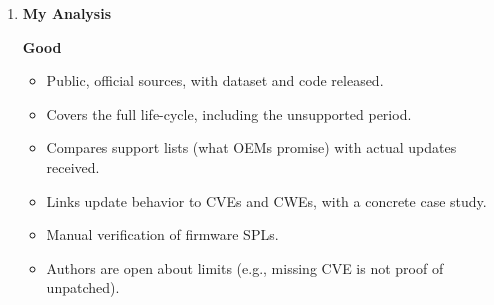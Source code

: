 \documentclass[11pt,a4paper]{article}
\newcommand{\entrypart}[1]{\textbf{\color{accent}#1}\par\vspace{2pt}}
\begin{document}
\begin{enumerate}
    \vspace{4pt}
    \textbf{Limitations (authors)}
    \begin{itemize}[leftmargin=*,itemsep=1pt,topsep=2pt]
        \item Older models or discontinued lines may lack complete archival data.
        \item Huawei, Vivo, Motorola, LG data are sparse, fragmented, or incomplete; used for overarching patterns, not detailed quantitative conclusions.
        \item Oppo data lack China, the US, and the U.K.
        \item A CVE missing on an OEM site is not conclusive proof of unpatched status; OEMs may silently integrate patches.
        \item Samsung support durations are a lower bound (devices may keep receiving updates).
        \item EOL dates inferred from last update, as OEMs do not announce them.
        \item Oppo's last Android version matched from a third-party dataset (lower bound).
        \item No active user base data; end-user behavior and carrier analysis out of scope.
        \item Reasons for late or missing updates cannot be determined (no public OEM explanations).
        \item CVSS 4.0 user-interaction reclassification not possible at scale.
        \item Other OEMs (e.g., Nokia, OnePlus, Realme, Sony) and international carriers left to future work.
    \end{itemize}

    \item \entrypart{My Analysis}

    \textbf{Good}
    \begin{itemize}[leftmargin=*,itemsep=1pt,topsep=2pt]
        \item Public, official sources, with dataset and code released.
        \item Covers the full life-cycle, including the unsupported period.
        \item Compares support lists (what OEMs promise) with actual updates received.
        \item Links update behavior to CVEs and CWEs, with a concrete case study.
        \item Manual verification of firmware SPLs.
        \item Authors are open about limits (e.g., missing CVE is not proof of unpatched).
    \end{itemize}


\end{enumerate}
\end{document}

